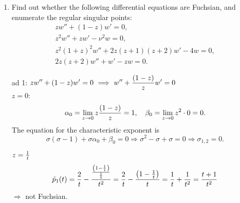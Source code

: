 {\begin{enumerate}
Note that $y_2(z)$ already represents the general solution of (\ref{2016-m-ch-sf-efmEu}).
Alternatively we could have started from $y_1(z)$ and applied d'Alembert's {\it Ansatz}
(\ref{2011-m-ch-sf-dalambansatz})--(\ref{2011-m-ch-sf-fc2123}):
\begin{equation}
v' (z) + v (z)\left(\frac{2}{z} + \frac{1}{z}\right) = 0 \textrm{, or } v' (z) = - \frac{3 v (z)}{z}
\end{equation}
yields
\begin{equation}
\frac{d v}{v} = - 3\frac{d z}{z} \textrm{, and }\log v = -3 \log z \textrm{, or } v(z) = z^{-3}.
\end{equation}
Therefore, according to (\ref{2011-m-ch-sf-dalambansatz}),
\begin{equation}
y_2(z) = y_1(z) \int_z  v(s) ds  = A z \left(-\frac{1}{2z^2}\right) = \frac{A'}{z}  .
\end{equation}








\item
Find out whether the following differential equations are Fuchsian,
and enumerate the regular singular points:
\begin{equation}
\begin{split}
zw''+(1-z)w'=0 ,  \\
z^2w''+zw'-\nu ^2 w=0 ,  \\
z^2(1+z)^2w''+2z(z+1)(z+2)w'-4w=0 , \\
2z(z+2)w'' +w' -zw=0.
\end{split}
\end{equation}

{ ad 1:} $\displaystyle zw''+(1-z)w'=0\ \Longrightarrow
\ w''+{(1-z)\over z}w'=0$\\[2ex]
 {$z=0$:}
$$
   \alpha_0=\lim_{z\to0}z{(1-z)\over z}=1,\quad
   \beta_0=\lim_{z\to0}z^2\cdot0=0.
$$
The equation for the characteristic exponent is
$$
   \sigma(\sigma-1)+\sigma\alpha_0+\beta_0=0\Longrightarrow
   \sigma^2-\sigma+\sigma=0\Longrightarrow\sigma_{1,2}=0.
$$

\bigskip

 $  z={1\over t}$
$$
   \tilde p_1(t)={2\over t}-{{\left(1-{1\over t}\right)\over{1\over t}}\over
   t^2}={2\over t}-{\left(1-{1\over t}\right)\over t}={1\over t}
   +{1\over t^2}={t+1\over t^2}
$$
$\Longrightarrow$ not Fuchsian.


\end{enumerate}}
